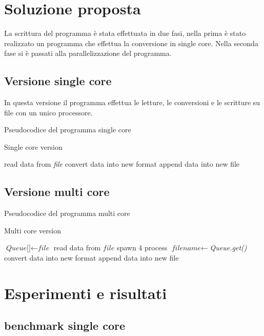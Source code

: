 \documentclass[11pt,a4paper,twoside,openright]{book}
\begin{document}
\chapter{Soluzione proposta}
La scrittura del programma è stata effettuata in due fasi, nella prima è stato realizzato un programma che effettua la conversione in single core. Nella seconda fase si è passati alla parallelizzazione del programma.


\section{Versione single core}
In questa versione il programma effettua le letture, le conversioni e le scritture su file con un unico processore.

Pseudocodice del programma single core
\begin{algorithm}
\caption{Single core version}\label{single core version}
\begin{algorithmic}[1]
\State read data from \textit{file}
\State convert data into new format
\State append data into new file
\EndFor

\EndProcedure
\end{algorithmic}
\end{algorithm}
\section{Versione multi core}

Pseudocodice del programma multi core
\begin{algorithm}
\caption{Multi core version}\label{multi core version}
\begin{algorithmic}[1]
\State $\textit{Queue[]} \gets \textit{file}$
\State read data from $\textit{file}$
\State spawn 4 process
\State $\textit{filename} \gets $\textit{Queue.get()}
\State convert data into new format
\State append data into new file
\EndWhile
\EndFor
\EndProcedure
\end{algorithmic}
\end{algorithm}


\chapter{Esperimenti e risultati}

\section{benchmark single core}
\end{document}
